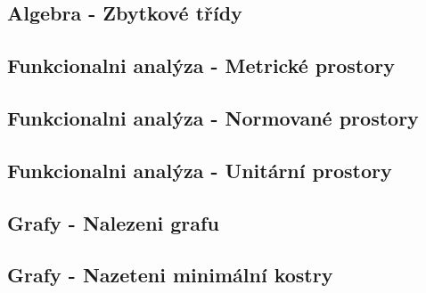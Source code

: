 \documentclass[12pt,a4paper,notitlepage,final]{article}
\begin{document}
\subsection{Algebra - Zbytkové třídy}
\setcounter{section}{3}
\setcounter{subsection}{4}



\setcounter{section}{6}
\setcounter{subsection}{8}
\subsection{Funkcionalni analýza - Metrické prostory}
\setcounter{section}{4}
\setcounter{subsection}{1}

\setcounter{section}{6}
\setcounter{subsection}{9}
\subsection{Funkcionalni analýza - Normované prostory}
\setcounter{section}{4}
\setcounter{subsection}{2}

\setcounter{section}{6}
\setcounter{subsection}{10}
\subsection{Funkcionalni analýza - Unitární prostory}
\setcounter{section}{4}
\setcounter{subsection}{3}


\setcounter{section}{6}
\setcounter{subsection}{11}
\subsection{Grafy - Nalezeni grafu}
\setcounter{section}{5}
\setcounter{subsection}{1}

\setcounter{section}{6}
\setcounter{subsection}{12}
\subsection{Grafy - Nazeteni minimální kostry}
\setcounter{section}{5}
\setcounter{subsection}{2}

\end{document}
